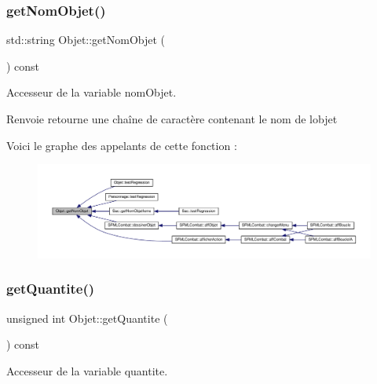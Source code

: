 \subsubsection{\texorpdfstring{get\+Nom\+Objet()}{getNomObjet()}}
{\footnotesize\ttfamily std\+::string Objet\+::get\+Nom\+Objet (\begin{DoxyParamCaption}{ }\end{DoxyParamCaption}) const}



Accesseur de la variable nom\+Objet. 

\begin{DoxyReturn}{Renvoie}
retourne une chaîne de caractère contenant le nom de l\textquotesingle{}objet 
\end{DoxyReturn}
Voici le graphe des appelants de cette fonction \+:\nopagebreak
\begin{figure}[H]
\begin{center}
\leavevmode
\includegraphics[width=350pt]{class_objet_a29be0a2d83cdebac4fedd495e3824515_icgraph}
\end{center}
\end{figure}
\mbox{\label{class_objet_a3352afeefcae6415b3c73112fd588ab5}} 
\subsubsection{\texorpdfstring{get\+Quantite()}{getQuantite()}}
{\footnotesize\ttfamily unsigned int Objet\+::get\+Quantite (\begin{DoxyParamCaption}{ }\end{DoxyParamCaption}) const}



Accesseur de la variable quantite. 

